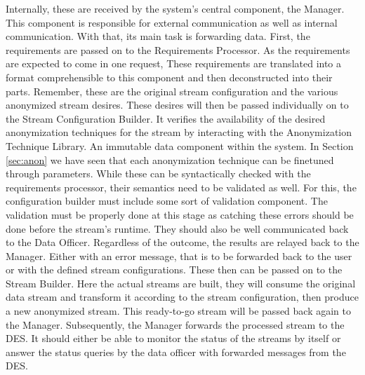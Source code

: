 Internally, these are received by the system's central component, the Manager. This component is responsible for external communication as well as internal communication. With that, its main task is forwarding data. First, the requirements are passed on to the Requirements Processor. As the requirements are expected to come in one request, These requirements are translated into a format comprehensible to this component and then deconstructed into their parts. Remember, these are the original stream configuration and the various anonymized stream desires. These desires will then be passed individually on to the Stream Configuration Builder. It verifies the availability of the desired anonymization techniques for the stream by interacting with the Anonymization Technique Library. An immutable data component within the system. In Section \ref{sec:anon} we have seen that each anonymization technique can be finetuned through parameters. While these can be syntactically checked with the requirements processor, their semantics need to be validated as well. For this, the configuration builder must include some sort of validation component. The validation must be properly done at this stage as catching these errors should be done before the stream's runtime. They should also be well communicated back to the Data Officer. Regardless of the outcome, the results are relayed back to the Manager. Either with an error message, that is to be forwarded back to the user or with the defined stream configurations. These then can be passed on to the Stream Builder. Here the actual streams are built, they will consume the original data stream and transform it according to the stream configuration, then produce a new anonymized stream. This ready-to-go stream will be passed back again to the Manager. Subsequently, the Manager forwards the processed stream to the \ac{DES}. It should either be able to monitor the status of the streams by itself or answer the status queries by the data officer with forwarded messages from the \ac{DES}. \par

